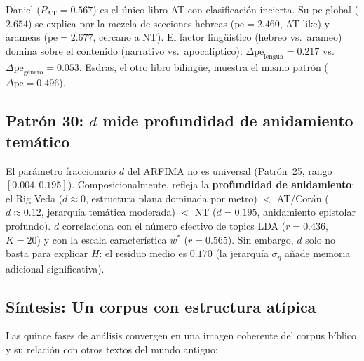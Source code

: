\documentclass[12pt,a4paper]{article}
\begin{document}
Daniel ($P_{\text{AT}} = 0.567$) es el \'unico libro AT con clasificaci\'on
incierta. Su pe global ($2.654$) se explica por la mezcla de secciones
hebreas ($\text{pe} = 2.460$, AT-like) y arameas ($\text{pe} = 2.677$,
cercano a NT). El factor ling\"u\'istico (hebreo vs.\ arameo) domina sobre
el contenido (narrativo vs.\ apocal\'iptico): $\Delta\text{pe}_{\text{lengua}} = 0.217$
vs.\ $\Delta\text{pe}_{\text{g\'enero}} = 0.053$. Esdras, el otro libro biling\"ue,
muestra el mismo patr\'on ($\Delta\text{pe} = 0.496$).

\subsection{Patr\'on 30: $d$ mide profundidad de anidamiento tem\'atico}

El par\'ametro fraccionario $d$ del ARFIMA no es universal
(Patr\'on~25, rango $[0.004, 0.195]$). Composicionalmente, refleja la
\textbf{profundidad de anidamiento}: el Rig Veda ($d \approx 0$, estructura plana
dominada por metro) $<$ AT/Cor\'an ($d \approx 0.12$, jerarqu\'ia tem\'atica moderada)
$<$ NT ($d = 0.195$, anidamiento epistolar profundo). $d$ correlaciona con el
n\'umero efectivo de topics LDA ($r = 0.436$, $K = 20$) y con la escala
caracter\'istica $w^*$ ($r = 0.565$). Sin embargo, $d$ solo no basta para
explicar $H$: el residuo medio es $0.170$ (la jerarqu\'ia $\sigma_\eta$
a\~nade memoria adicional significativa).

\subsection{S\'intesis: Un corpus con estructura at\'ipica}

Las quince fases de an\'alisis convergen en una imagen coherente del corpus b\'iblico
y su relaci\'on con otros textos del mundo antiguo:
\end{document}
